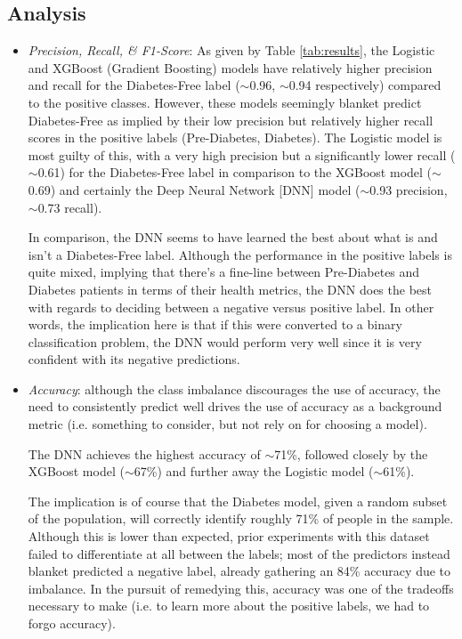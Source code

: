 \documentclass[conference]{IEEEtran}
\begin{document}
    \subsection{Analysis}
        \begin{itemize}
            \item \textit{Precision, Recall, \& F1-Score}: As given by Table \ref{tab:results}, the Logistic and XGBoost (Gradient Boosting) models have relatively higher precision and recall for the Diabetes-Free label ($\sim$0.96, $\sim$0.94 respectively) compared to the positive classes. However, these models seemingly blanket predict Diabetes-Free as implied by their low precision but relatively higher recall scores in the positive labels (Pre-Diabetes, Diabetes). The Logistic model is most guilty of this, with a very high precision but a significantly lower recall ($\sim$0.61) for the Diabetes-Free label in comparison to the XGBoost model ($\sim$0.69) and certainly the Deep Neural Network [DNN] model ($\sim$0.93 precision, $\sim$0.73 recall).

            In comparison, the DNN seems to have learned the best about what is and isn't a Diabetes-Free label. Although the performance in the positive labels is quite mixed, implying that there's a fine-line between Pre-Diabetes and Diabetes patients in terms of their health metrics, the DNN does the best with regards to deciding between a negative versus positive label. In other words, the implication here is that if this were converted to a binary classification problem, the DNN would perform very well since it is very confident with its negative predictions.

            \item \textit{Accuracy}: although the class imbalance discourages the use of accuracy, the need to consistently predict well drives the use of accuracy as a background metric (i.e. something to consider, but not rely on for choosing a model).

            The DNN achieves the highest accuracy of $\sim$71\%, followed closely by the XGBoost model ($\sim$67\%) and further away the Logistic model ($\sim$61\%).

            The implication is of course that the Diabetes model, given a random subset of the population, will correctly identify roughly 71\% of people in the sample. Although this is lower than expected, prior experiments with this dataset failed to differentiate at all between the labels; most of the predictors instead blanket predicted a negative label, already gathering an 84\% accuracy due to imbalance. In the pursuit of remedying this, accuracy was one of the tradeoffs necessary to make (i.e. to learn more about the positive labels, we had to forgo accuracy).


\end{itemize}
\end{document}
